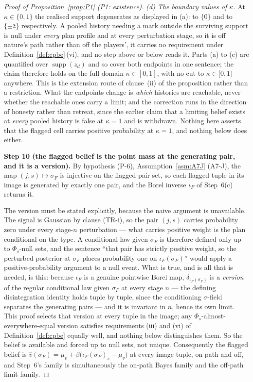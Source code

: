 \begin{proof}[Proof of Proposition~\ref{prop:P1} (P1: existence)]
\emph{(d) The boundary values of $\kappa$.} At $\kappa \in \{0,1\}$ the realised support degenerates
as displayed in (a): to $\{0\}$ and to $\{\pm\bar z\}$ respectively. A pooled history needing a mark
outside the surviving support is null under \emph{every} plan profile and at every perturbation
stage, so it is off nature's path rather than off the players', it carries no requirement under
Definition~\ref{def:cpbe}\,(vi), and no step above or below reads it. Parts (a) to (c) are quantified
over $\operatorname{supp}(z_d)$ and so cover both endpoints in one sentence; the claim therefore
holds on the full domain $\kappa \in [0,1]$, with no cut to $\kappa \in [0,1)$ anywhere. This is the
extension route of clause~(ii) of the proposition rather than a restriction. What the endpoints
change is \emph{which} histories are reachable, never whether the reachable ones carry a limit; and
the correction runs in the direction of honesty rather than retreat, since the earlier claim that a
limiting belief exists at \emph{every} pooled history is false at $\kappa = 1$ and is withdrawn.
Nothing here asserts that the flagged cell carries positive probability at $\kappa = 1$, and nothing
below does either.

\smallskip
\noindent\textbf{Step 10 (the flagged belief is the point mass at the generating pair, and it is a
version).}
By hypothesis (P-6), Assumption~\ref{asm:A7J} (A7-J), the map $(j,s) \mapsto \sigma_F$ is injective on the
flagged-pair set, so each flagged tuple in its image is generated by exactly one pair, and the Borel
inverse $\iota_F$ of Step~6(c) returns it.

The version must be stated explicitly, because the naive argument is unavailable. The signal is
Gaussian by clause (TR-i), so the pair $(j,s)$ carries probability zero under every stage-$n$
perturbation --- what carries positive weight is the plan conditional on the type. A conditional law
given $\sigma_F$ is therefore defined only up to $\Phi_s$-null sets, and the sentence ``that pair has
strictly positive weight, so the perturbed posterior at $\sigma_F$ places probability one on
$\iota_F(\sigma_F)$'' would apply a positive-probability argument to a null event. What is true, and
is all that is needed, is this: because $\iota_F$ is a genuine pointwise Borel map,
$\delta_{\iota_F(\sigma_F)}$ is a \emph{version} of the regular conditional law given $\sigma_F$ at
every stage $n$ --- the defining disintegration identity holds tuple by tuple, since the conditioning
$\sigma$-field separates the generating pairs --- and it is invariant in $n$, hence its own limit.
This proof selects that version at every tuple in the image; any $\Phi_s$-almost-everywhere-equal
version satisfies requirements (iii) and (vi) of Definition~\ref{def:cpbe} equally well, and nothing
below distinguishes them. So the belief is available and forced up to null sets, not unique.
Consequently the flagged belief is $\hat v(\sigma_F) = \mu_v + \beta\bigl(\iota_F(\sigma_F)_s -
\mu_v\bigr)$ at every image tuple, on path and off, and Step~6's family is simultaneously the on-path
Bayes family and the off-path limit family.


\end{proof}
